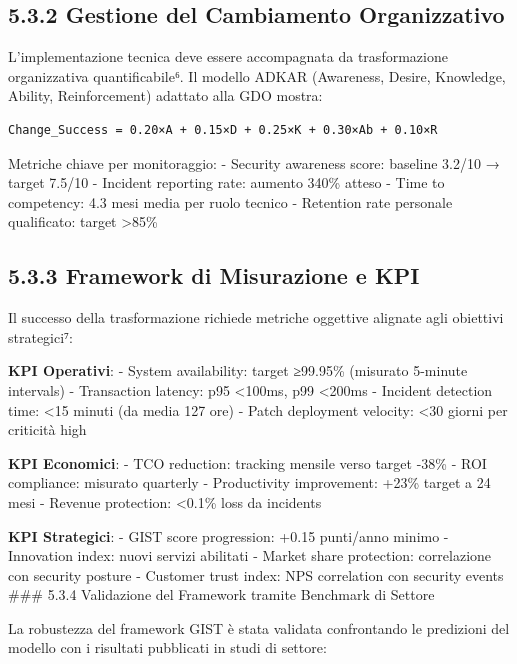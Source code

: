 \documentclass[12pt,a4paper,oneside]{book}
\numberwithin{figure}{chapter} %
\numberwithin{table}{chapter}  %
\begin{document}
\subsection{5.3.2 Gestione del Cambiamento
Organizzativo}\label{gestione-del-cambiamento-organizzativo}

L'implementazione tecnica deve essere accompagnata da trasformazione
organizzativa quantificabile⁶. Il modello ADKAR (Awareness, Desire,
Knowledge, Ability, Reinforcement) adattato alla GDO mostra:

\begin{verbatim}
Change_Success = 0.20×A + 0.15×D + 0.25×K + 0.30×Ab + 0.10×R
\end{verbatim}

Metriche chiave per monitoraggio: - Security awareness score: baseline
3.2/10 → target 7.5/10 - Incident reporting rate: aumento 340\% atteso -
Time to competency: 4.3 mesi media per ruolo tecnico - Retention rate
personale qualificato: target \textgreater85\%

\subsection{5.3.3 Framework di Misurazione e
KPI}\label{framework-di-misurazione-e-kpi}

Il successo della trasformazione richiede metriche oggettive alignate
agli obiettivi strategici⁷:

\textbf{KPI Operativi}: - System availability: target ≥99.95\% (misurato
5-minute intervals) - Transaction latency: p95 \textless100ms, p99
\textless200ms - Incident detection time: \textless15 minuti (da media
127 ore) - Patch deployment velocity: \textless30 giorni per criticità
high

\textbf{KPI Economici}: - TCO reduction: tracking mensile verso target
-38\% - ROI compliance: misurato quarterly - Productivity improvement:
+23\% target a 24 mesi - Revenue protection: \textless0.1\% loss da
incidents

\textbf{KPI Strategici}: - GIST score progression: +0.15 punti/anno
minimo - Innovation index: nuovi servizi abilitati - Market share
protection: correlazione con security posture - Customer trust index:
NPS correlation con security events \#\#\# 5.3.4 Validazione del
Framework tramite Benchmark di Settore

La robustezza del framework GIST è stata validata confrontando le
predizioni del modello con i risultati pubblicati in studi di settore:
\end{document}
